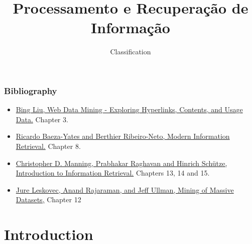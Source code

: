 \documentclass{beamer}
\title{Processamento e Recuperação de Informação}
\subtitle{Classification}
\begin{document}
\maketitle
\makeoutline


\begin{frame}
    \frametitle{Bibliography}
    \begin{block}{}
        \begin{itemize}
        \item \href{https://www.cs.uic.edu/~liub/WebMiningBook.html}{Bing Liu, Web Data Mining - Exploring Hyperlinks, Contents, and Usage Data.} Chapter 3.

        \item \href{http://www.mir2ed.org}{Ricardo Baeza-Yates and Berthier Ribeiro-Neto, Modern Information Retrieval.} Chapter 8.

        \item \href{http://nlp.stanford.edu/IR-book/}{Christopher D. Manning, Prabhakar Raghavan and Hinrich Schütze, Introduction to Information Retrieval.} Chapters 13, 14 and 15.

        \item \href{http://www.mmds.org}{Jure Leskovec, Anand Rajaraman, and Jeff Ullman, Mining of Massive Datasets,} Chapter 12
        \end{itemize}
    \end{block}
\end{frame}

\section{Introduction}
\end{document}
